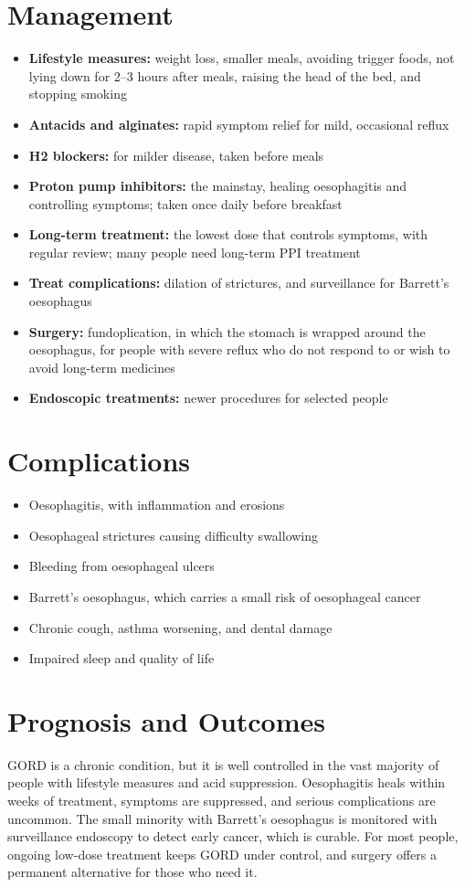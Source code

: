 \section*{Management}
\begin{itemize}
    \item \textbf{Lifestyle measures:} weight loss, smaller meals, avoiding trigger foods, not lying down for 2--3 hours after meals, raising the head of the bed, and stopping smoking
    \item \textbf{Antacids and alginates:} rapid symptom relief for mild, occasional reflux
    \item \textbf{H2 blockers:} for milder disease, taken before meals
    \item \textbf{Proton pump inhibitors:} the mainstay, healing oesophagitis and controlling symptoms; taken once daily before breakfast
    \item \textbf{Long-term treatment:} the lowest dose that controls symptoms, with regular review; many people need long-term PPI treatment
    \item \textbf{Treat complications:} dilation of strictures, and surveillance for Barrett's oesophagus
    \item \textbf{Surgery:} fundoplication, in which the stomach is wrapped around the oesophagus, for people with severe reflux who do not respond to or wish to avoid long-term medicines
    \item \textbf{Endoscopic treatments:} newer procedures for selected people
\end{itemize}

\section*{Complications}
\begin{itemize}
    \item Oesophagitis, with inflammation and erosions
    \item Oesophageal strictures causing difficulty swallowing
    \item Bleeding from oesophageal ulcers
    \item Barrett's oesophagus, which carries a small risk of oesophageal cancer
    \item Chronic cough, asthma worsening, and dental damage
    \item Impaired sleep and quality of life
\end{itemize}

\section*{Prognosis and Outcomes}
GORD is a chronic condition, but it is well controlled in the vast majority of people with lifestyle measures and acid suppression. Oesophagitis heals within weeks of treatment, symptoms are suppressed, and serious complications are uncommon. The small minority with Barrett's oesophagus is monitored with surveillance endoscopy to detect early cancer, which is curable. For most people, ongoing low-dose treatment keeps GORD under control, and surgery offers a permanent alternative for those who need it.

